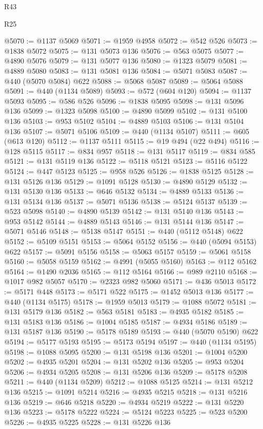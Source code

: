 \begin{lexlean}{R43}
\begin{lexlean}{R25}
\begin{coremodule}
{{{{{{{{{{{{{{{{{{{{{{{{{{{{{{{{{{{{{{{{{{{{{{{{{{{{{{{{{{{{{{{{{{{{{{{{{{{{{{{{{{{{{{{{{{{{{{{{{{{{{{{{{{{{{{{{{{{{{{{{{{{{{{{{{{{{{{{{{{{{{{{{{{{{{{{{{{{{{{{{{{{{{{{{{{{{{{{{{{{{{{{{{{{{{{{{{@5070 := @1137 @5069
@5071 := @1959 @4958
@5072 := @542 @526
@5073 := @1838 @5072
@5075 := @131 @5073 @136
@5076 := @563 @5075
@5077 := @4890 @5076
@5079 := @131 @5077 @136
@5080 := @1323 @5079
@5081 := @4889 @5080
@5083 := @131 @5081 @136
@5084 := @5071 @5083
@5087 := @440 (@5070 @5084) @622
@5088 := @5068 @5087
@5089 := @5064 @5088
@5091 := @440 (@1134 @5089)
@5093 := @572 (@604 @120)
@5094 := @1137 @5093
@5095 := @586 @526
@5096 := @1838 @5095
@5098 := @131 @5096 @136
@5099 := @1323 @5098
@5100 := @4890 @5099
@5102 := @131 @5100 @136
@5103 := @953 @5102
@5104 := @4889 @5103
@5106 := @131 @5104 @136
@5107 := @5071 @5106
@5109 := @440 (@1134 @5107)
@5111 := @605 (@613 @120)
@5112 := @1137 @5111
@5115 := @19 @494 (@22 @494)
@5116 := @128 @5115
@5117 := @834 @957
@5118 := @131 @5117
@5119 := @834 @585
@5121 := @131 @5119 @136
@5122 := @5118 @5121
@5123 := @5116 @5122
@5124 := @447 @5123
@5125 := @958 @526
@5126 := @1838 @5125
@5128 := @131 @5126 @136
@5129 := @1091 @5128
@5130 := @4890 @5129
@5132 := @131 @5130 @136
@5133 := @646 @5132
@5134 := @4889 @5133
@5136 := @131 @5134 @136
@5137 := @5071 @5136
@5138 := @5124 @5137
@5139 := @523 @5098
@5140 := @4890 @5139
@5142 := @131 @5140 @136
@5143 := @953 @5142
@5144 := @4889 @5143
@5146 := @131 @5144 @136
@5147 := @5071 @5146
@5148 := @5138 @5147
@5151 := @440 (@5112 @5148) @622
@5152 := @5109 @5151
@5153 := @5064 @5152
@5156 := @440 (@5094 @5153) @622
@5157 := @5091 @5156
@5158 := @5063 @5157
@5159 := @5061 @5158
@5160 := @5058 @5159
@5162 := @4991 (@5055 @5160)
@5163 := @112 @5162
@5164 := @1490 @2036
@5165 := @112 @5164
@5166 := @989 @2110
@5168 := @1017 @982 @5057
@5170 := @2323 @982 @5060
@5171 := @436 @5013
@5172 := @5171 @448
@5173 := @5171 @522
@5175 := @1452 @5013 @136
@5177 := @440 (@1134 @5175)
@5178 := @1959 @5013
@5179 := @1088 @5072
@5181 := @131 @5179 @136
@5182 := @563 @5181
@5183 := @4935 @5182
@5185 := @131 @5183 @136
@5186 := @1004 @5185
@5187 := @4934 @5186
@5189 := @131 @5187 @136
@5190 := @5178 @5189
@5193 := @440 (@5070 @5190) @622
@5194 := @5177 @5193
@5195 := @5173 @5194
@5197 := @440 (@1134 @5195)
@5198 := @1088 @5095
@5200 := @131 @5198 @136
@5201 := @1004 @5200
@5202 := @4935 @5201
@5204 := @131 @5202 @136
@5205 := @953 @5204
@5206 := @4934 @5205
@5208 := @131 @5206 @136
@5209 := @5178 @5208
@5211 := @440 (@1134 @5209)
@5212 := @1088 @5125
@5214 := @131 @5212 @136
@5215 := @1091 @5214
@5216 := @4935 @5215
@5218 := @131 @5216 @136
@5219 := @646 @5218
@5220 := @4934 @5219
@5222 := @131 @5220 @136
@5223 := @5178 @5222
@5224 := @5124 @5223
@5225 := @523 @5200
@5226 := @4935 @5225
@5228 := @131 @5226 @136
}}}}}}}}}}}}}}}}}}}}}}}}}}}}}}}}}}}}}}}}}}}}}}}}}}}}}}}}}}}}}}}}}}}}}}}}}}}}}}}}}}}}}}}}}}}}}}}}}}}}}}}}}}}}}}}}}}}}}}}}}}}}}}}}}}}}}}}}}}}}}}}}}}}}}}}}}}}}}}}}}}}}}}}}}}}}}}}}}}}}}}}}}}}}}}}}}
\end{coremodule}
\end{lexlean}
\end{lexlean}
